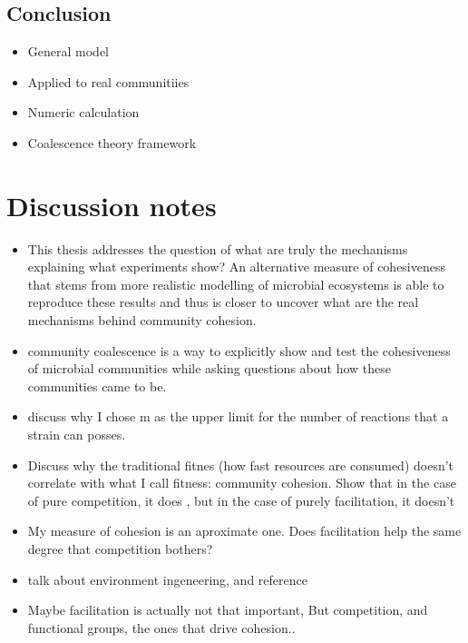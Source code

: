 \documentclass[titlepage,11pt]{article}
\begin{document}
\begin{linenumbers}
\begin{singlespace}
			\subsection{Conclusion}
				\begin{itemize}
					\item General model
					\item Applied to real communitiies
					\item Numeric calculation
					\item Coalescence theory framework
				\end{itemize}
	
	
\newpage
\section{Discussion notes}
\begin{itemize}
	\item This thesis addresses the question of what are truly the mechanisms explaining what experiments show? An alternative measure of cohesiveness that stems from more realistic modelling of microbial ecosystems is able to reproduce these results and thus is closer to uncover what are the real mechanisms behind community cohesion.
	\item community coalescence is a way to explicitly show and test the cohesiveness of microbial communities while asking questions about how these communities came to be.
	\item discuss why I chose m as the upper limit for the number of reactions that a strain can posses.
	\item Discuss why the traditional fitnes (how fast resources are consumed) doesn't correlate with what I call fitness: community cohesion. Show that in the case of pure competition, it does \citep{Tikhonov2016}, but in the case of purely facilitation, it doesn't
	\item  My measure of cohesion is an aproximate one. Does facilitation help the same degree that competition bothers?
	\item talk about environment ingeneering, and reference 
	\item Maybe facilitation is actually not that important, But competition, and functional groups, the ones that drive cohesion..

\end{itemize}
\end{singlespace}
\end{linenumbers}
\end{document}
